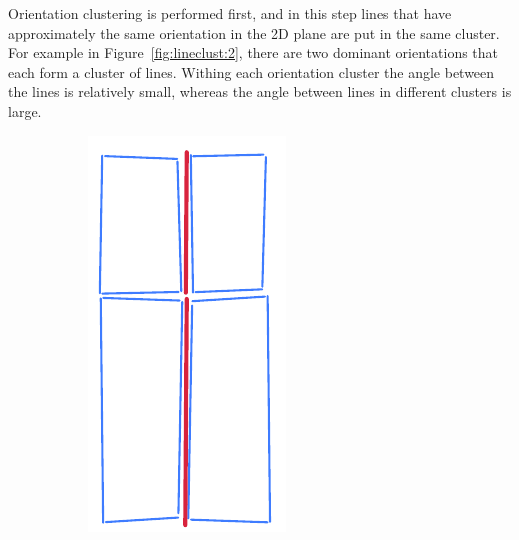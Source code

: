 Orientation clustering is performed first, and in this step lines that have approximately the same orientation in the 2D plane are put in the same cluster. For example in Figure~\ref{fig:lineclust:2}, there are two dominant orientations that each form a cluster of lines. Withing each orientation cluster the angle between the lines is relatively small, whereas the angle between lines in different clusters is large.
\begin{figure}
	\centering
	\begin{subfigure}[b]{0.48\linewidth}
		\includegraphics[angle=90,width=\linewidth]{figs/line-clustering/slice1.pdf}

\end{subfigure}
\end{figure}

